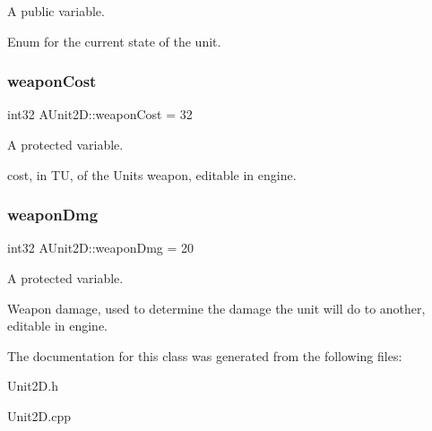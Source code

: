 A public variable. 

Enum for the current state of the unit. \hypertarget{class_a_unit2_d_ab8a5bca2e21f1c992b887646d19a7025}{}\label{class_a_unit2_d_ab8a5bca2e21f1c992b887646d19a7025} 
\subsubsection{\texorpdfstring{weapon\+Cost}{weaponCost}}
{\footnotesize\ttfamily int32 A\+Unit2\+D\+::weapon\+Cost = 32\hspace{0.3cm}{\ttfamily [protected]}}



A protected variable. 

cost, in TU, of the Unit\textquotesingle{}s weapon, editable in engine. \hypertarget{class_a_unit2_d_a583df0bd3be284fddf24c1c627053767}{}\label{class_a_unit2_d_a583df0bd3be284fddf24c1c627053767} 
\subsubsection{\texorpdfstring{weapon\+Dmg}{weaponDmg}}
{\footnotesize\ttfamily int32 A\+Unit2\+D\+::weapon\+Dmg = 20\hspace{0.3cm}{\ttfamily [protected]}}



A protected variable. 

Weapon damage, used to determine the damage the unit will do to another, editable in engine. 

The documentation for this class was generated from the following files\+:\begin{DoxyCompactItemize}
\item 
Unit2\+D.\+h\item 
Unit2\+D.\+cpp\end{DoxyCompactItemize}
